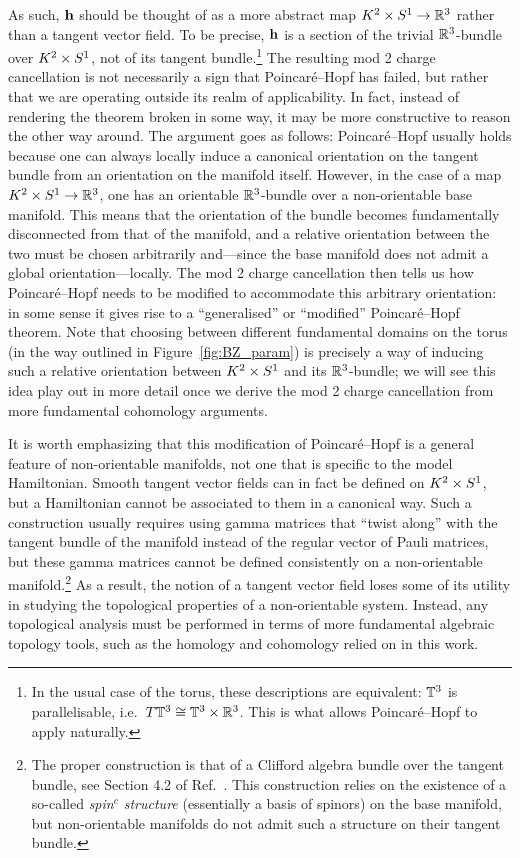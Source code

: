 As such, $\vb{h}$ should be thought of as a more abstract map $K^2\times S^1\to\mathbb{R}^3$ rather than a tangent vector field. To be precise, $\vb{h}$ is a section of the trivial $\mathbb{R}^3$-bundle over $K^2\times S^1$, not of its tangent bundle.\footnote{
	In the usual case of the torus, these descriptions are equivalent: $\mathbb{T}^3$ is parallelisable, i.e.\ $T\mathbb{T}^3\cong \mathbb{T}^3\times\mathbb{R}^3$. This is what allows Poincaré--Hopf to apply naturally.}
The resulting mod 2 charge cancellation is not necessarily a sign that Poincaré--Hopf has failed, but rather that we are operating outside its realm of applicability. In fact, instead of rendering the theorem broken in some way, it may be more constructive to reason the other way around. The argument goes as follows: Poincaré--Hopf usually holds because one can always locally induce a canonical orientation on the tangent bundle from an orientation on the manifold itself. However, in the case of a map $K^2\times S^1\to\mathbb{R}^3$, one has an orientable $\mathbb{R}^3$-bundle over a non-orientable base manifold. This means that the orientation of the bundle becomes fundamentally disconnected from that of the manifold, and a relative orientation between the two must be chosen arbitrarily and---since the base manifold does not admit a global orientation---locally. The mod 2 charge cancellation then tells us how Poincaré--Hopf needs to be modified to accommodate this arbitrary orientation: in some sense it gives rise to a ``generalised'' or ``modified'' Poincaré--Hopf theorem. Note that choosing between different fundamental domains on the torus (in the way outlined in Figure~\ref{fig:BZ_param}) is precisely a way of inducing such a relative orientation between $K^2\times S^1$ and its $\mathbb{R}^3$-bundle; we will see this idea play out in more detail once we derive the mod 2 charge cancellation from more fundamental cohomology arguments.

It is worth emphasizing that this modification of Poincaré--Hopf is a general feature of non-orientable manifolds, not one that is specific to the model Hamiltonian. Smooth tangent vector fields can in fact be defined on $K^2\times S^1$, but a Hamiltonian cannot be associated to them in a canonical way. Such a construction usually requires using gamma matrices that ``twist along'' with the tangent bundle of the manifold instead of the regular vector of Pauli matrices, but these gamma matrices cannot be defined consistently on a non-orientable manifold.\footnote{
	The proper construction is that of a Clifford algebra bundle over the tangent bundle, see Section 4.2 of Ref.~\cite{Mathai_math-review}. This construction relies on the existence of a so-called \emph{spin$^c$ structure} (essentially a basis of spinors) on the base manifold, but non-orientable manifolds do not admit such a structure on their tangent bundle.} %
As a result, the notion of a tangent vector field loses some of its utility in studying the topological properties of a non-orientable system. Instead, any topological analysis must be performed in terms of more fundamental algebraic topology tools, such as the homology and cohomology relied on in this work.

